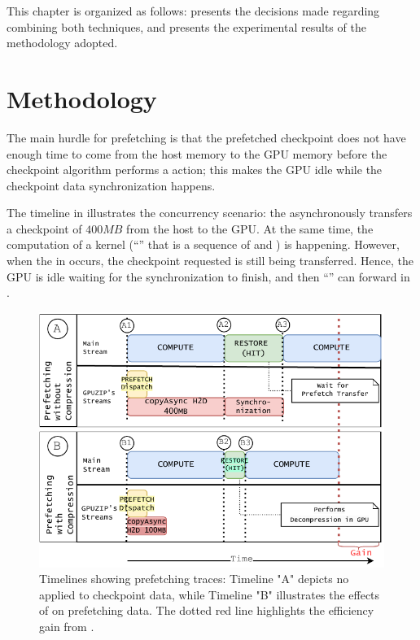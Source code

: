 \documentclass[Ingles]{ic-tese-v3}
\begin{document}
This chapter is organized as follows:  presents the decisions made regarding combining both techniques, and  presents the experimental results of the methodology adopted.

\section{Methodology}
\label{sec:comppref_methodology}

The main hurdle for prefetching is that the prefetched checkpoint does not have enough time to come from the host memory to the GPU memory before the checkpoint algorithm performs a \restore action; this makes the GPU idle while the checkpoint data synchronization happens.

The timeline  in  illustrates the concurrency scenario: the   asynchronously transfers a checkpoint of $400MB$ from the host to the GPU. At the same time, the computation of a kernel (``'' that is a sequence of \fwd and \bwd) is happening. However, when the \restore in  occurs, the checkpoint requested is still being transferred. Hence, the GPU is idle waiting for the synchronization to finish, and then ``'' can forward in .

\begin{figure}
  \centering
  \includegraphics[width=0.8\linewidth,trim={0 0 0 0},clip]{figures/async.pdf}
  \caption[Timeliness for \checkpointprefetching with and without \compression]{Timelines showing prefetching traces: Timeline "A" depicts no \compression applied to checkpoint data, while Timeline "B" illustrates the effects of \compression on prefetching data. The dotted red line highlights the efficiency gain from \compression.}
  \label{fig:async}
\end{figure}
\end{document}
